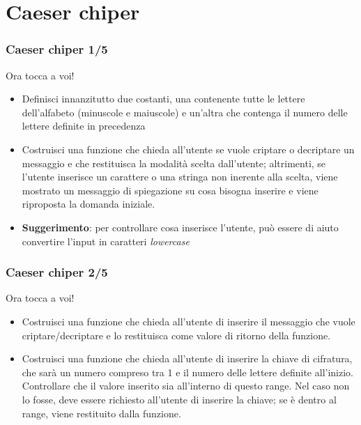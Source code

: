 \documentclass{beamer}
\begin{document}
\section{Caeser chiper}

\begin{frame}[fragile]
\frametitle{Caeser chiper 1/5}
\begin{block}{Ora tocca a voi!}
	\begin{itemize}
		\item Definisci innanzitutto due costanti, una contenente tutte le lettere dell'alfabeto (minuscole e maiuscole) e un'altra che contenga il numero delle lettere definite in precedenza
		\item Costruisci una funzione che chieda all'utente se vuole criptare o decriptare un messaggio e che restituisca la modalità scelta dall'utente; altrimenti, se l'utente inserisce un carattere o una stringa non inerente alla scelta, viene mostrato un messaggio di spiegazione su cosa bisogna inserire e viene riproposta la domanda iniziale.
		\item \textbf{Suggerimento}: per controllare cosa inserisce l'utente, può essere di aiuto convertire l'input in caratteri \textit{lowercase} 
	\end{itemize}
\end{block}
\end{frame}

\begin{frame}[fragile]
\frametitle{Caeser chiper 2/5}
\begin{block}{Ora tocca a voi!}
	\begin{itemize}
		\item Costruisci una funzione che chieda all'utente di inserire il messaggio che vuole criptare/decriptare e lo restituisca come valore di ritorno della funzione.
		\item Costruisci una funzione che chieda all'utente di inserire la chiave di cifratura, che sarà un numero compreso tra 1 e il numero delle lettere definite all'inizio. Controllare che il valore inserito sia all'interno di questo range. Nel caso non lo fosse, deve essere richiesto all'utente di inserire la chiave; se è dentro al range, viene restituito dalla funzione.
	\end{itemize}
\end{block}
\end{frame}
\end{document}
